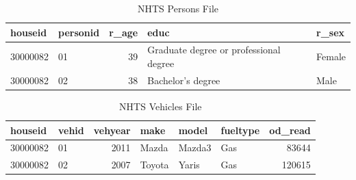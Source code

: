 \documentclass[
]{book}
\begin{document}
\begin{table}

\caption{\label{tab:show-nhts-persons}NHTS Persons File}
\centering
\begin{tabular}[t]{l|l|r|l|l}
\hline
houseid & personid & r\_age & educ & r\_sex\\
\hline
30000082 & 01 & 39 & Graduate degree or professional degree & Female\\
\hline
30000082 & 02 & 38 & Bachelor's degree & Male\\
\hline
\end{tabular}
\end{table}

\begin{table}

\caption{\label{tab:show-nhts-vehicles}NHTS Vehicles File}
\centering
\begin{tabular}[t]{l|l|r|l|l|l|r}
\hline
houseid & vehid & vehyear & make & model & fueltype & od\_read\\
\hline
30000082 & 01 & 2011 & Mazda & Mazda3 & Gas & 83644\\
\hline
30000082 & 02 & 2007 & Toyota & Yaris & Gas & 120615\\
\hline
\end{tabular}
\end{table}
\end{document}
